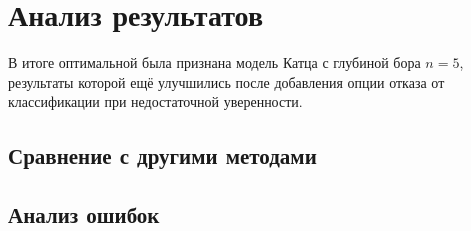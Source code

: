 
\section{ Анализ результатов }\label{sec:analysis}

В итоге оптимальной была признана модель Катца с глубиной бора $n=5$, результаты которой ещё улучшились после добавления опции отказа от классификации при недостаточной уверенности.



\subsection{ Сравнение с другими методами }



\subsection{ Анализ ошибок }
